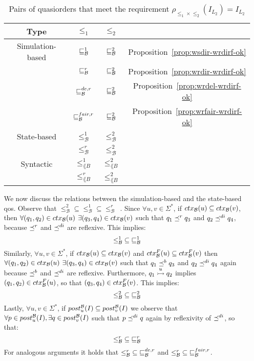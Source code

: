 \begin{table}[h]
\centering
\begin{tabular}{ c | c | c | c }
    \textbf{Type} & $\leq_1$ & $\leq_2$ &  \\
    \hline
    \hline
    Simulation-based & $\sqsubseteq^1_{\mathcal{B}}$ & $\sqsubseteq_{\mathcal{B}}^{2}$ & Proposition~\ref{prop:wsdir-wrdirf-ok} \\
    &$\sqsubseteq_{\mathcal{B}}^r$ & $\sqsubseteq_{\mathcal{B}}^{2}$ & Proposition~\ref{prop:wrdir-wrdirf-ok} \\
    &$\sqsubseteq_{\mathcal{B}}^{de,r}$ & $\sqsubseteq_{\mathcal{B}}^{2}$ & Proposition~\ref{prop:wrdel-wrdirf-ok} \\
    &$\sqsubseteq_{\mathcal{B}}^{fair,r}$ &  $\sqsubseteq_{\mathcal{B}}^{2}$ & Proposition~\ref{prop:wrfair-wrdirf-ok} \\
    \hline
    State-based & $\leq_{\mathcal{B}}^1$ &  ${\leq_{\mathcal{B}}^2}$ & \cite{ganty2020omegalang} \\
    &$\leq_{\mathcal{B}}^r$ &  ${\leq_{\mathcal{B}}^2}$ & \cite{ganty2020omegalang} \\
    \hline
    Syntactic & $\leq_{\lang{B}}^1$ &  ${\leq_{\lang{B}}^2}$ & \cite{ganty2020omegalang} \\
    &$\leq_{\lang{B}}^r$ &  ${\leq_{\lang{B}}^2}$ & \cite{ganty2020omegalang} \\
\end{tabular}
\caption{Pairs of quasiorders that meet the requirement $\rho_{\leq_1 \times \leq_2}(I_{L_2}) = I_{L_2}$}
\label{table:framework-wqos}
\end{table}

We now discuss the relations between the simulation-based and the
state-based qos.
Observe that $\mathord{\leq^2_{\mathcal{B}}} \subseteq \mathord{\leq^1_{\mathcal{B}}} \subseteq \mathord{\leq^r_{\mathcal{B}}}$~\cite{ganty2020omegalang}.
Since $\forall u,v \in \Sigma^*$, if $ctx_{\mathcal{B}}(u) \subseteq ctx_{\mathcal{B}}(v)$, then
$\forall (q_1,q_2) \in ctx_{\mathcal{B}}(u)$ $\exists (q_3,q_4) \in ctx_{\mathcal{B}}(v)$
such that $q_1 \preceq^r q_3$ and $q_2 \preceq^{di} q_4$, because $\preceq^r$ and $\preceq^{di}$
are reflexive.
This implies:
\[ \mathord{\leq^1_{\mathcal{B}}} \subseteq \mathord{\sqsubseteq^1_{\mathcal{B}}}\]
Similarly, $\forall u,v \in \Sigma^*$,
if $ctx_{\mathcal{B}}(u) \subseteq ctx_{\mathcal{B}}(v)$ and $ctx^F_{\mathcal{B}}(u) \subseteq ctx^F_{\mathcal{B}}(v)$ then
$\forall (q_1,q_2) \in ctx_{\mathcal{B}}(u)$ $\exists (q_3,q_4) \in ctx_{\mathcal{B}}(v)$
such that $q_1 \preceq^b q_3$ and $q_2 \preceq^{di} q_4$ again
because $\preceq^b$ and $\preceq^{di}$ are reflexive.
Furthermore, $q_1 \overset{u}{\rightarrowtail} q_2$ implies $(q_1,q_2) \in ctx^F_{\mathcal{B}}(u)$,
so that $(q_3,q_4) \in ctx^F_{\mathcal{B}}(v)$.
This implies:
\[ \mathord{\leq^2_{\mathcal{B}}} \subseteq \mathord{\sqsubseteq_{\mathcal{B}}^{2}}\]
Lastly, $\forall u,v \in \Sigma^*$, if $post_{u}^{\mathcal{B}}(I) \subseteq post_{v}^{\mathcal{B}}(I)$
we observe that $\forall p \in post_{u}^{\mathcal{B}}(I), \exists q \in post_{v}^{\mathcal{B}}(I)$
such that $p \preceq^{di} q$ again by reflexivity of $\preceq^{di}$,
so that:
\[ \mathord{\leq^r_{\mathcal{B}}} \subseteq \mathord{\sqsubseteq_{\mathcal{B}}^r} \]
For analogous arguments it holds that
$\mathord{\leq^r_{\mathcal{B}}} \subseteq \mathord{\sqsubseteq_{\mathcal{B}}^{de,r}}$ and
$\mathord{\leq^r_{\mathcal{B}}} \subseteq \mathord{\sqsubseteq_{\mathcal{B}}^{fair,r}}$.

